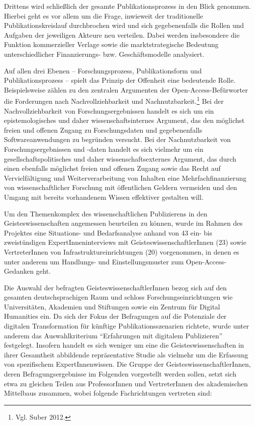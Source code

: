 \documentclass[a4paper,
fontsize=11pt,
oneside,
numbers=noperiodatend,
parskip=half-,
bibliography=totoc,
final
]{scrartcl}
\begin{document}
Drittens wird schließlich der gesamte Publikationsprozess in den Blick
genommen. Hierbei geht es vor allem um die Frage, inwieweit der
traditionelle Publikationskreislauf durchbrochen wird und sich
gegebenenfalls die Rollen und Aufgaben der jeweiligen Akteure neu
verteilen. Dabei werden insbesondere die Funktion kommerzieller Verlage
sowie die marktstrategische Bedeutung unterschiedlicher Finanzierungs-
bzw. Geschäftsmodelle analysiert.

Auf allen drei Ebenen -- Forschungsprozess, Publikationsform und
Publikationsprozess -- spielt das Prinzip der Offenheit eine bedeutende
Rolle. Beispielsweise zählen zu den zentralen Argumenten der
Open-Access-Befürworter die Forderungen nach Nachvollziehbarkeit und
Nachnutzbarkeit.\footnote{Vgl. Suber 2012.} Bei der Nachvollziehbarkeit
von Forschungsergebnissen handelt es sich um ein epistemologisches und
daher wissenschaftsinternes Argument, das den möglichst freien und
offenen Zugang zu Forschungsdaten und gegebenenfalls Softwareanwendungen
zu begründen versucht. Bei der Nachnutzbarkeit von Forschungsergebnissen
und -daten handelt es sich vielmehr um ein gesellschaftspolitisches und
daher wissenschaftsexternes Argument, das durch einen ebenfalls
möglichst freien und offenen Zugang sowie das Recht auf Vervielfältigung
und Weiterverarbeitung von Inhalten eine Mehrfachfinanzierung von
wissenschaftlicher Forschung mit öffentlichen Geldern vermeiden und den
Umgang mit bereits vorhandenem Wissen effektiver gestalten will.

Um den Themenkomplex des wissenschaftlichen Publizierens in den
Geisteswissenschaften angemessen beurteilen zu können, wurde im Rahmen
des Projektes eine Situations- und Bedarfsanalyse anhand von 43 ein- bis
zweistündigen ExpertInneninterviews mit GeisteswissenschaftlerInnen (23)
sowie VertreterInnen von Infrastruktureinrichtungen (20) vorgenommen, in
denen es unter anderem um Handlungs- und Einstellungsmuster zum
Open-Access-Gedanken geht.

Die Auswahl der befragten GeisteswissenschaftlerInnen bezog sich auf den
gesamten deutschsprachigen Raum und schloss Forschungseinrichtungen wie
Universitäten, Akademien und Stiftungen sowie ein Zentrum für Digital
Humanities ein. Da sich der Fokus der Befragungen auf die Potenziale der
digitalen Transformation für künftige Publikationsszenarien richtete,
wurde unter anderem das Auswahlkriterium \enquote{Erfahrungen mit
digitalem Publizieren} festgelegt. Insofern handelt es sich weniger um
eine die Geisteswissenschaften in ihrer Gesamtheit abbildende
repräsentative Studie als vielmehr um die Erfassung von spezifischem
ExpertInnenwissen. Die Gruppe der GeisteswissenschaftlerInnen, deren
Befragungsergebnisse im Folgenden vorgestellt werden sollen, setzt sich
etwa zu gleichen Teilen aus ProfessorInnen und VertreterInnen des
akademischen Mittelbaus zusammen, wobei folgende Fachrichtungen
vertreten sind:
\end{document}
